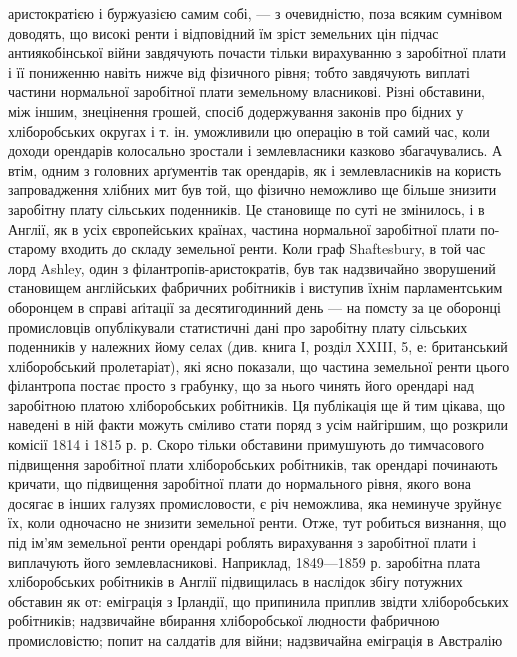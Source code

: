 \parcont{}  %
аристократією і буржуазією самим собі, — з очевидністю, поза всяким сумнівом
доводять, що високі ренти і відповідний їм зріст земельних цін підчас антиякобінської
війни завдячують почасти тільки вирахуванню з заробітної плати
і її пониженню навіть нижче від фізичного рівня; тобто завдячують виплаті
частини нормальної заробітної плати земельному власникові. Різні обставини,
між іншим, знецінення грошей, спосіб додержування законів про бідних
у хліборобських округах і т. ін. уможливили цю операцію в той самий час, коли
доходи орендарів колосально зростали і землевласники казково збагачувались.
А втім, одним з головних арґументів так орендарів, як і землевласників на
користь запровадження хлібних мит був той, що фізично неможливо ще більше
знизити заробітну плату сільських поденників. Це становище по суті не змінилось,
і в Англії, як в усіх європейських країнах, частина нормальної
заробітної плати по-старому входить до складу земельної ренти. Коли
граф Shaftesbury, в той час лорд Ashley, один з філантропів-аристократів,
був так надзвичайно зворушений становищем англійських фабричних робітників
і виступив їхнім парламентським оборонцем в справі аґітації за десятигодинний
день — на помсту за це оборонці промисловців опублікували статистичні
дані про заробітну плату сільських поденників у належних йому селах (див.
книга І, розділ XXIII, 5, е: британський хліборобський пролетаріат), які
ясно показали, що частина земельної ренти цього філантропа постає просто
з грабунку, що за нього чинять його орендарі над заробітною платою
хліборобських робітників. Ця публікація ще й тим цікава, що наведені в ній
факти можуть сміливо стати поряд з усім найгіршим, що розкрили комісії
1814 і 1815 р. р. Скоро тільки обставини примушують до тимчасового підвищення
заробітної плати хліборобських робітників, так орендарі починають кричати, що
підвищення заробітної плати до нормального рівня, якого вона досягає в інших
галузях промисловости, є річ неможлива, яка неминуче зруйнує їх, коли
одночасно не знизити земельної ренти. Отже, тут робиться визнання, що під
ім’ям земельної ренти орендарі роблять вирахування з заробітної плати і виплачують
його землевласникові. Наприклад, 1849—1859 р. заробітна плата хліборобських
робітників в Англії підвищилась в наслідок збігу потужних обставин
як от: еміграція з Ірландії, що припинила приплив звідти хліборобських
робітників; надзвичайне вбирання хліборобської людности фабричною промисловістю;
попит на салдатів для війни; надзвичайна еміграція в Австралію
